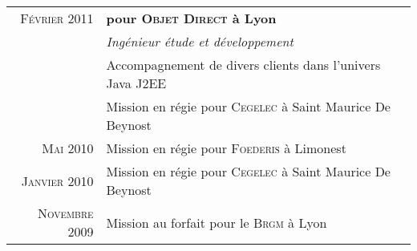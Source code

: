 \documentclass[a4paper,10pt]{article}
\begin{document}
\begin{supertabular}{r|p{11cm}}
    \textsc{Février} 2011 & \textbf{pour \textsc{Objet Direct} à Lyon} \\
      & \emph{Ingénieur étude et développement} \\
      & \footnotesize{Accompagnement de divers clients dans l’univers Java J2EE} \\
      & \footnotesize{Mission en régie pour \textsc{Cegelec} à Saint Maurice De Beynost} \\
    \footnotesize{\textsc{Mai} 2010} & \footnotesize{Mission en régie pour \textsc{Foederis} à Limonest} \\
    \footnotesize{\textsc{Janvier} 2010} & \footnotesize{Mission en régie pour \textsc{Cegelec} à Saint Maurice De Beynost} \\
    \footnotesize{\textsc{Novembre} 2009} & \footnotesize{Mission au forfait pour le \textsc{Brgm} à Lyon} \\

\end{supertabular}
\end{document}
